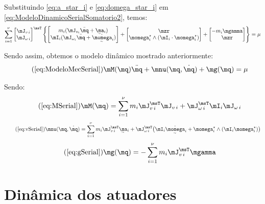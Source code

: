 \documentclass[]{politex}
\begin{document}
Substituindo \eqref{eq:a_star_i} e  \eqref{eq:domega_star_i} em \eqref{eq:ModeloDinamicoSerialSomatorio2}, temos:
\begin{equation}
\sum_{i=1}^\nu
\begin{bmatrix}
\mJ_{v\,i} \\
\mJ_{\omega\,i}
\end{bmatrix}^\msT
\begin{Bmatrix}
\begin{bmatrix}
m_i (\mJ_{v_i} \ddot{\mq} + \underaccent{\sim}{\ma}_i   )  \\
 \mI_i (\mJ_{\omega_i} \ddot{\mq} + \underaccent{\sim}{\dot{\momega}}_i )
\end{bmatrix}
+
\begin{bmatrix}
\mzr \\
\momega^\star_i \wedge (\mI_i \cdot \momega^\star_i)
\end{bmatrix}
+
\begin{bmatrix}
-m_i \mgamma \\
\mzr
\end{bmatrix}
\end{Bmatrix}
=\mu
\end{equation}

Sendo assim, obtemos o modelo dinâmico mostrado anteriormente:
\begin{equation} \tag{\ref{eq:ModeloMecSerial}}
\mM(\mq) \ddot{\mq} + \mnu(\mq,\dot{\mq}) + \mg(\mq) = \mu
\end{equation}

Sendo:
\begin{equation} \tag{\ref{eq:MSerial}}
\mM(\mq) = \sum_{i=1}^\nu
m_i \mJ_{v\,i}^\msT \mJ_{v\,i} + \mJ_{\omega\,i}^\msT \mI_i \mJ_{\omega\,i}
\end{equation}
\begin{equation} \tag{\ref{eq:vSerial}}
\mnu(\mq, \dot{\mq}) = \sum_{i=1}^\nu
 m_i \mJ_{v\,i}^\msT \underaccent{\sim}{\ma}_i + \mJ_{\omega\,i}^\msT \big( \mI_i \underaccent{\sim}{\dot{\momega}}_i + \momega^\star_i \wedge (\mI_i  \momega^\star_i) \big)
\end{equation}
\begin{equation} \tag{\ref{eq:gSerial}}
\mg(\mq) = - \sum_{i=1}^\nu m_i \mJ_{v\,i}^\msT \mgamma
\end{equation}

\section{Dinâmica dos atuadores}
\end{document}
